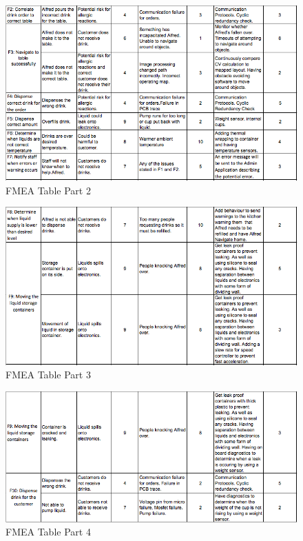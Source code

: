 \documentclass [10pt]{article}
\begin{document}
\begin{figure} [h!]
	\centering
	\includegraphics [scale = 0.7] {figures/FMEA_2.png}
	\caption{FMEA Table Part 2}
\end{figure}

\begin{figure} [h!]
	\centering
	\includegraphics [scale = 0.7] {figures/FMEA_3.png}
	\caption{FMEA Table Part 3}
\end{figure}

\begin{figure} [h!]
	\centering
	\includegraphics [scale = 0.7] {figures/FMEA_4.png}
	\caption{FMEA Table Part 4}
\end{figure}
\end{document}
